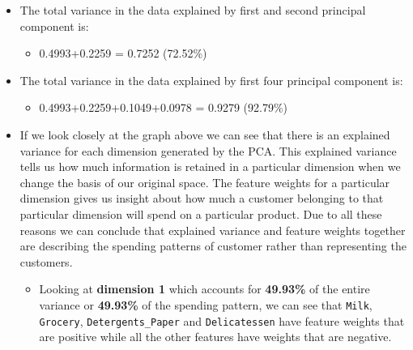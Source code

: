 \documentclass[11pt]{article}
\providecommand{\tightlist}{%
      \setlength{\itemsep}{0pt}\setlength{\parskip}{0pt}}
\begin{document}
\begin{itemize}
\item
  The total variance in the data explained by first and second principal
  component is:

  \begin{itemize}
  \tightlist
  \item
    0.4993+0.2259 = 0.7252 (72.52\%)
  \end{itemize}
\item
  The total variance in the data explained by first four principal
  component is:

  \begin{itemize}
  \tightlist
  \item
    0.4993+0.2259+0.1049+0.0978 = 0.9279 (92.79\%)
  \end{itemize}
\item
  If we look closely at the graph above we can see that there is an
  explained variance for each dimension generated by the PCA. This
  explained variance tells us how much information is retained in a
  particular dimension when we change the basis of our original space.
  The feature weights for a particular dimension gives us insight about
  how much a customer belonging to that particular dimension will spend
  on a particular product. Due to all these reasons we can conclude that
  explained variance and feature weights together are describing the
  spending patterns of customer rather than representing the customers.

  \begin{itemize}
  \item
    Looking at \textbf{dimension 1} which accounts for \textbf{49.93\%}
    of the entire variance or \textbf{49.93\%} of the spending pattern,
    we can see that \texttt{Milk}, \texttt{Grocery},
    \texttt{Detergents\_Paper} and \texttt{Delicatessen} have feature
    weights that are positive while all the other features have weights
    that are negative.


\end{itemize}
\end{itemize}
\end{document}
